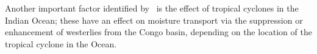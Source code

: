 \documentclass[../main.tex]{subfiles}
\begin{document}
Another important factor identified by~\cite{finney_effect_2020} is the effect of tropical cyclones in the Indian Ocean; these have an effect on moisture transport via the suppression or enhancement of westerlies from the Congo basin, depending on the location of the tropical cyclone in the Ocean.














\end{document}
